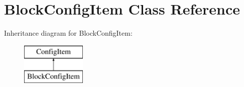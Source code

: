 \hypertarget{classBlockConfigItem}{\section{Block\-Config\-Item Class Reference}
\label{classBlockConfigItem}
}
Inheritance diagram for Block\-Config\-Item\-:\begin{figure}[H]
\begin{center}
\leavevmode
\includegraphics[height=2.000000cm]{classBlockConfigItem}
\end{center}
\end{figure}
